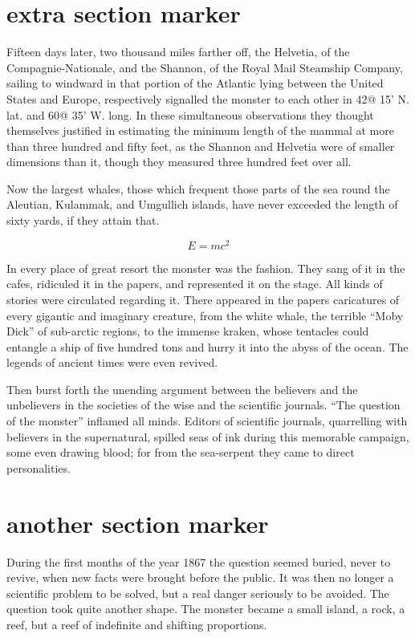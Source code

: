 \section{extra section marker}

Fifteen days later, two thousand miles farther off, the Helvetia,
of the Compagnie-Nationale, and the Shannon, of the Royal
Mail Steamship Company, sailing to windward in that portion
of the Atlantic lying between the United States and Europe,
respectively signalled the monster to each other in 42@ 15' N. lat.
and 60@ 35' W. long.  In these simultaneous observations they
thought themselves justified in estimating the minimum length
of the mammal at more than three hundred and fifty feet,
as the Shannon and Helvetia were of smaller dimensions than it,
though they measured three hundred feet over all.

Now the largest whales, those which frequent those parts of the sea round
the Aleutian, Kulammak, and Umgullich islands, have never exceeded the length
of sixty yards, if they attain that.

\begin{equation}
E=mc^2
\end{equation}

In every place of great resort the monster was the fashion.
They sang of it in the cafes, ridiculed it in the papers, and represented
it on the stage.  All kinds of stories were circulated regarding it.
There appeared in the papers caricatures of every gigantic and
imaginary creature, from the white whale, the terrible ``Moby Dick''
of sub-arctic regions, to the immense kraken, whose tentacles could entangle
a ship of five hundred tons and hurry it into the abyss of the ocean.
The legends of ancient times were even revived.

Then burst forth the unending argument between the believers and the
unbelievers in the societies of the wise and the scientific journals.
``The question of the monster'' inflamed all minds.  Editors of
scientific journals, quarrelling with believers in the supernatural,
spilled seas of ink during this memorable campaign, some even drawing blood;
for from the sea-serpent they came to direct personalities.

\section{another section marker}

During the first months of the year 1867 the question seemed buried,
never to revive, when new facts were brought before the public.
It was then no longer a scientific problem to be solved, but a real
danger seriously to be avoided.  The question took quite another shape.
The monster became a small island, a rock, a reef, but a reef of indefinite
and shifting proportions.

